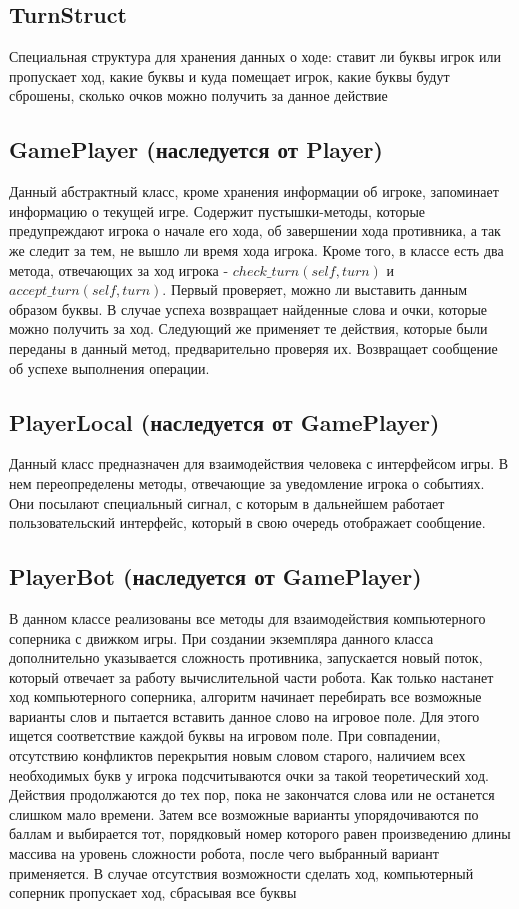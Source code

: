 \documentclass[a4paper,14pt]{article}
\begin{document}
	\subsection{TurnStruct}
	Специальная структура для хранения данных о ходе: ставит ли буквы игрок или пропускает ход, какие буквы и куда помещает игрок, какие буквы будут сброшены, сколько очков можно получить за данное действие
	
	\subsection[GamePlayer]{GamePlayer (наследуется от Player)}
	Данный абстрактный класс, кроме хранения информации об игроке, запоминает информацию о текущей игре. Содержит пустышки-методы, которые предупреждают игрока о начале его хода, об завершении хода противника, а так же следит за тем, не вышло ли время хода игрока. Кроме того, в классе есть два метода, отвечающих за ход игрока - $check\_turn(self, turn)$ и $accept\_turn(self, turn)$. Первый проверяет, можно ли выставить данным образом буквы. В случае успеха возвращает найденные слова и очки, которые можно получить за ход. Следующий же применяет те действия, которые были переданы в данный метод, предварительно проверяя их. Возвращает сообщение об успехе выполнения операции.
	
	\subsection[PlayerLocal]{PlayerLocal (наследуется от GamePlayer)}
	Данный класс предназначен для взаимодействия человека с интерфейсом игры. В нем переопределены методы, отвечающие за уведомление игрока о событиях. Они посылают специальный сигнал, с которым в дальнейшем работает пользовательский интерфейс, который в свою очередь отображает сообщение.
	
	\subsection[PlayerBot]{PlayerBot (наследуется от GamePlayer)}
	В данном классе реализованы все методы для взаимодействия компьютерного соперника с движком игры. При создании экземпляра данного класса дополнительно указывается сложность противника, запускается новый поток, который отвечает за работу вычислительной части робота. Как только настанет ход компьютерного соперника, алгоритм начинает перебирать все возможные варианты слов и пытается вставить данное слово на игровое поле. Для этого ищется соответствие каждой буквы на игровом поле. При совпадении, отсутствию конфликтов перекрытия новым словом старого, наличием всех необходимых букв у игрока подсчитываются очки за такой теоретический ход. Действия продолжаются до тех пор, пока не закончатся слова или не останется слишком мало времени. Затем все возможные варианты упорядочиваются по баллам и выбирается тот, порядковый номер которого равен произведению длины массива на уровень сложности робота, после чего выбранный вариант применяется. В случае отсутствия возможности сделать ход, компьютерный соперник пропускает ход, сбрасывая все буквы
	
\end{document}
